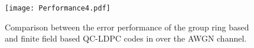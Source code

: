 \documentclass[journal,draftclsnofoot,onecolumn,12pt,twoside]{IEEEtran}
\begin{document}

\begin{figure}[!h]
\centering
\texttt{[image: Performance4.pdf]}
\caption{Comparison between the error performance of the group ring based and finite field based QC-LDPC codes in \cite[Example 1]{QC_cyclic} over the AWGN channel.}
\label{figsim4}
\end{figure}
\end{document}
